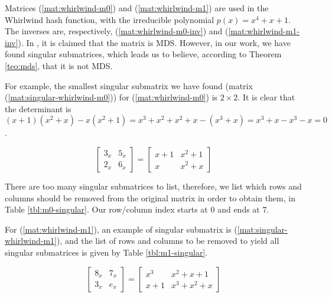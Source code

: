 
Matrices (\ref{mat:whirlwind-m0}) and (\ref{mat:whirlwind-m1}) are used in the Whirlwind hash function, with the irreducible polynomial $p(x) = x^4+x+1$. The inverses are, respectively, (\ref{mat:whirlwind-m0-inv}) and (\ref{mat:whirlwind-m1-inv}). In \cite{Whirlwind2010}, it is claimed that the matrix is MDS. However, in our work, we have found singular submatrices, which leads us to believe, according to Theorem \ref{teo:mds}, that it is not MDS.

For example, the smallest singular submatrix we have found (matrix (\ref{mat:singular-whirlwind-m0})) for (\ref{mat:whirlwind-m0}) is $2 \times 2$. It is clear that the determinant is $(x+1)(x^2+x) - x(x^2+1) = x^3+x^2+x^2+x - (x^3+x) = x^3+x-x^3-x = 0$.

\begin{equation}\label{mat:singular-whirlwind-m0}
\begin{bmatrix}
3_x & 5_x\\
2_x & 6_x
\end{bmatrix}
=
\begin{bmatrix}
x+1 & x^2+1\\
x & x^2+x
\end{bmatrix}
\end{equation}

There are too many singular submatrices to list, therefore, we list which rows and columns should be removed from the original matrix in order to obtain them, in Table \ref{tbl:m0-singular}. Our row/column index starts at $0$ and ends at $7$.



For (\ref{mat:whirlwind-m1}), an example of singular submatrix is (\ref{mat:singular-whirlwind-m1}), and the list of rows and columns to be removed to yield all singular submatrices is given by Table \ref{tbl:m1-singular}.

\begin{equation}\label{mat:singular-whirlwind-m1}
\begin{bmatrix}
8_x & 7_x\\
3_x & e_x
\end{bmatrix}
=
\begin{bmatrix}
x^3 & x^2 + x + 1\\
x + 1 & x^3 + x^2 + x
\end{bmatrix}
\end{equation}



